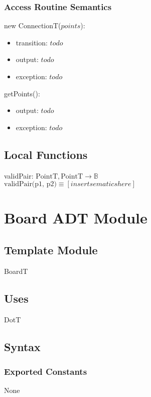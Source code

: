 \documentclass[12pt]{article}
\begin{document}
\subsubsection* {Access Routine Semantics}
new ConnectionT($points$):
\begin{itemize}
    \item transition: $todo$
    \item output: $todo$
    \item exception: $todo$
\end{itemize}

\noindent getPoints():
\begin{itemize}
    \item output: $todo$
    \item exception: $todo$
\end{itemize}


\subsection*{Local Functions}
validPair: $\mbox{PointT}, \mbox{PointT} \rightarrow \mathbb{B}$\\
$\mbox{validPair(p1, p2)} \equiv [insert sematics here]$\\


\newpage
\section* {Board ADT Module}
\subsection*{Template Module}
BoardT


\subsection* {Uses}
DotT


\subsection* {Syntax}
\subsubsection* {Exported Constants}
None
\end{document}
